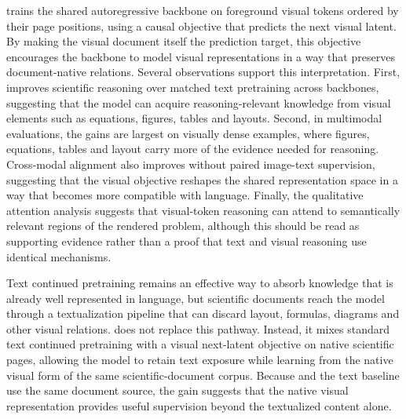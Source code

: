 \methodname trains the shared autoregressive backbone on foreground visual tokens ordered by their page positions, 
using a causal objective that predicts the next visual latent.
By making the visual document itself the prediction target, 
this objective encourages the backbone to model visual representations in a way that preserves document-native relations.
Several observations support this interpretation. 
First, \methodname improves scientific reasoning over matched text pretraining across backbones, suggesting that the model can acquire reasoning-relevant knowledge from visual elements such as equations, figures, tables and layouts. 
Second, in multimodal evaluations, the gains are largest on visually dense examples, 
where figures, equations, tables and layout carry more of the evidence needed for reasoning.
Cross-modal alignment also improves without paired image-text supervision, 
suggesting that the visual objective reshapes the shared representation space in a way that becomes more compatible with language. 
Finally, the qualitative attention analysis suggests that visual-token reasoning can attend to semantically relevant regions of the rendered problem, 
although this should be read as supporting evidence rather than a proof that text and visual reasoning use identical mechanisms.


Text continued pretraining remains an effective way to absorb knowledge that is already well represented in language, 
but scientific documents reach the model through a textualization pipeline that can discard layout, formulas, diagrams and other visual relations. 
\methodname does not replace this pathway. 
Instead, it mixes standard text continued pretraining with a visual next-latent objective on native scientific pages, 
allowing the model to retain text exposure while learning from the native visual form of the same scientific-document corpus.
Because \methodname and the text baseline use the same document source, 
the gain suggests that the native visual representation provides useful supervision beyond the textualized content alone.

